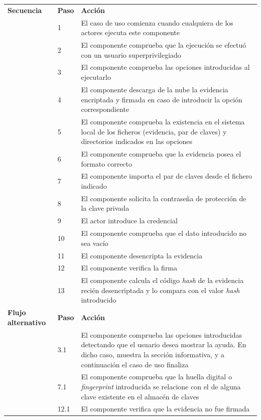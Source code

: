 \documentclass[12pt,a4paper, twoside]{report}
\begin{document}
\begin{longtable}{|p{3cm}|p{1cm}|p{12.5cm}|}
		{\cellcolor{Gainsboro}\textbf{Secuencia}} & \textbf{Paso} & \textbf{Acción}  \\ \cline{2-3} 
		\cellcolor{Gainsboro} & 1 & El caso de uso comienza cuando cualquiera de los actores ejecuta este componente \\ \cline{2-3} 
		\cellcolor{Gainsboro} & 2 & El componente comprueba que la ejecución se efectuó con un usuario superprivilegiado \\ \cline{2-3} 
		\cellcolor{Gainsboro} & 3 & El componente comprueba las opciones introducidas al ejecutarlo \\ \cline{2-3} 
		\cellcolor{Gainsboro} & 4 & El componente descarga de la nube la evidencia encriptada y firmada en caso de introducir la opción correspondiente \\ \cline{2-3} 
		\cellcolor{Gainsboro} & 5 & El componente comprueba la existencia en el sistema local de los ficheros (evidencia, par de claves) y directorios indicados en las opciones \\ \cline{2-3} 
		\cellcolor{Gainsboro} & 6 & El componente comprueba que la evidencia posea el formato correcto \\ \cline{2-3} 
		\cellcolor{Gainsboro} & 7 & El componente importa el par de claves desde el fichero indicado \\ \cline{2-3} 
		\cellcolor{Gainsboro} & 8 & El componente solicita la contraseña de protección de la clave privada \\ \cline{2-3} 
		\cellcolor{Gainsboro} & 9 & El actor introduce la credencial \\ \cline{2-3} 
		\cellcolor{Gainsboro} & 10 & El componente comprueba que el dato introducido no sea vacío \\ \cline{2-3} 
		\cellcolor{Gainsboro} & 11 & El componente desencripta la evidencia \\ \cline{2-3} 
		\cellcolor{Gainsboro} & 12 & El componente verifica la firma \\ \cline{2-3} 
		\cellcolor{Gainsboro} & 13 & El componente calcula el código \textit{hash} de la evidencia recién desencriptada y lo compara con el valor \textit{hash} introducido \\ \hline

		{\cellcolor{Gainsboro}\textbf{Flujo alternativo}} & \textbf{Paso} & \textbf{Acción} \\ \cline{2-3} 
		
		\cellcolor{Gainsboro} & 3.1 & El componente comprueba las opciones introducidas detectando que el usuario desea mostrar la ayuda. En dicho caso, muestra la sección informativa, y a continuación el caso de uso finaliza \\ \cline{2-3} 
		\cellcolor{Gainsboro} & 7.1 & El componente comprueba que la huella digital o \textit{fingerprint} introducida se relacione con el de alguna clave existente en el almacén de claves \\ \cline{2-3} 
		\cellcolor{Gainsboro} & 12.1 & El componente verifica que la evidencia no fue firmada \\ \hline


\end{longtable}
\end{document}

